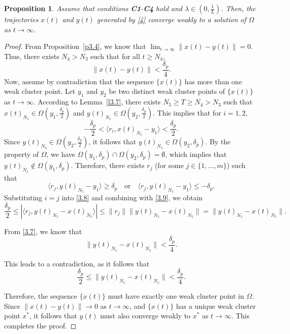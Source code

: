 \documentclass[hidelinks,11 pt]{article}
\numberwithin{equation}{section}
\newtheorem{proposition}[theorem]{Proposition}
\theoremstyle{definition}  %
\numberwithin{equation}{section}
\numberwithin{theorem}{section}
\begin{document}
\begin{proposition}
       Assume that conditions \textbf{C1}-\textbf{C4} hold and $\lambda\in(0,\frac{1}{L})$. Then, the trajectories \(x(t)\) and \(y(t)\) generated by \eqref{4} converge weakly to a solution of \(\Omega\) as \(t \to \infty\).
\end{proposition}
\begin{proof}
From Proposition~\ref{p3.4}, we know that \(\lim_{t \to \infty} \|x(t) - y(t)\| = 0\). Thus, there exists \(N_4 > N_3\) such that for all \(t \geq N_4\),
\begin{equation*}\label{3.7}
   \|x(t) - y(t)\| < \frac{\delta_p}{4}. \tag{3.7} 
\end{equation*}
Now, assume by contradiction that the sequence \(\{x(t)\}\) has more than one weak cluster point. Let \(y_1\) and \(y_2\) be two distinct weak cluster points of \(\{x(t)\}\) as \(t \to \infty\). According to Lemma~\ref{l3.7}, there exists \(N_5\geq T \geq N_4 > N_3\) such that \(x(t)_{N_5} \in \Omega(y_1, \frac{\delta_p}{2})\) and \(y(t)_{N_5} \in \Omega(y_2, \frac{\delta_p}{2})\). This implies that for \(i = 1, 2\),
\begin{equation*}\label{3.8}
    -\frac{\delta_p}{2} < \langle r_i, x(t)_{N_5} - y_1 \rangle < \frac{\delta_p}{2}. \tag{3.8}
\end{equation*}
Since \(y(t)_{N_5} \in \Omega(y_2, \frac{\delta_p}{2})\), it follows that \(y(t)_{N_5} \in \Omega(y_2, \delta_p)\). By the property of \(\Omega\), we have \(\Omega(y_1, \delta_p) \cap \Omega(y_2, \delta_p) = \emptyset\), which implies that \(y(t)_{N_5} \notin \Omega(y_1, \delta_p)\). Therefore, there exists \(r_j\) (for some \(j \in \{1, \dots, m\}\)) such that
\begin{equation*}\label{3.9}
    \langle r_j, y(t)_{N_5} - y_1 \rangle \geq \delta_p \quad \text{or} \quad \langle r_j, y(t)_{N_5} - y_1 \rangle \leq -\delta_p. \tag{3.9}
\end{equation*}
Substituting \(i = j\) into \eqref{3.8} and combining with \eqref{3.9}, we obtain
\[
\frac{\delta_p}{2} \leq |\langle r_j, y(t)_{N_5} - x(t)_{N_5} \rangle| \leq \|r_j\| \|y(t)_{N_5} - x(t)_{N_5}\| = \|y(t)_{N_5} - x(t)_{N_5}\|.
\]

From \eqref{3.7}, we know that
\[
\|y(t)_{N_5} - x(t)_{N_5}\| < \frac{\delta_p}{4}.
\]

This leads to a contradiction, as it follows that
\[
\frac{\delta_p}{2} \leq \|y(t)_{N_5} - x(t)_{N_5}\| < \frac{\delta_p}{4}.
\]

Therefore, the sequence \(\{x(t)\}\) must have exactly one weak cluster point in \(\Omega\). 
 Since \( \|x(t) - y(t)\| \to 0 \) as \( t \to \infty \), and \( \{x(t)\} \) has a unique weak cluster point \( x^* \), it follows that \( y(t) \) must also converge weakly to \( x^* \) as \( t \to \infty \).
This completes the proof.
\end{proof}
\end{document}
